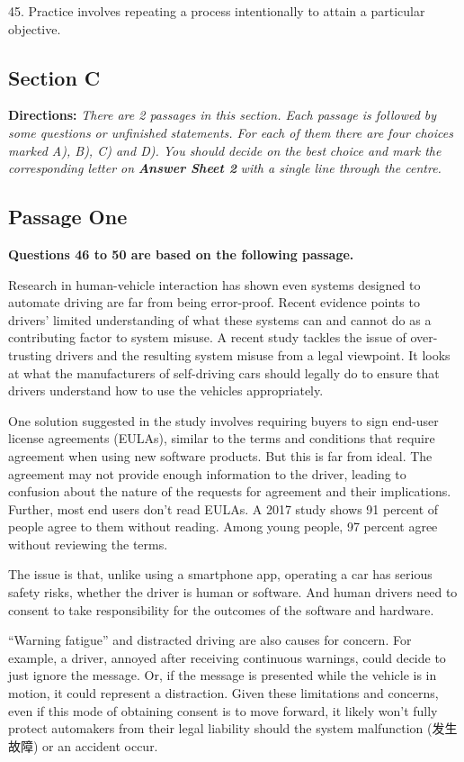 \documentclass[UTF8,11pt]{ctexart}
\begin{document}
45. Practice involves repeating a process intentionally to attain a particular objective.


\subsection*{\textbf{Section C}}


\textbf{Directions: }\textit{There are 2 passages in this section. Each passage is followed by some questions or unfinished} \textit{statements. For each of them there are four choices marked A), B), C) and D). You should decide on the best} \textit{choice and mark the corresponding letter on }\textbf{\textit{Answer Sheet 2}}\textit{ with a single line through the centre.}


\subsection*{\textbf{Passage One}}


\textbf{Questions 46 to 50 are based on the following passage.}


Research in human-vehicle interaction has shown even systems designed to automate driving are far from being error-proof. Recent evidence points to drivers’ limited understanding of what these systems can and cannot do as a contributing factor to system misuse. A recent study tackles the issue of over-trusting drivers and the resulting system misuse from a legal viewpoint. It looks at what the manufacturers of self-driving cars should legally do to ensure that drivers understand how to use the vehicles appropriately.


One solution suggested in the study involves requiring buyers to sign end-user license agreements (EULAs), similar to the terms and conditions that require agreement when using new software products. But this is far from ideal. The agreement may not provide enough information to the driver, leading to confusion about the nature of the requests for agreement and their implications. Further, most end users don’t read EULAs. A 2017 study shows 91 percent of people agree to them without reading. Among young people, 97 percent agree without reviewing the terms.


The issue is that, unlike using a smartphone app, operating a car has serious safety risks, whether the driver is human or software. And human drivers need to consent to take responsibility for the outcomes of the software and hardware.


“Warning fatigue” and distracted driving are also causes for concern. For example, a driver, annoyed after receiving continuous warnings, could decide to just ignore the message. Or, if the message is presented while the vehicle is in motion, it could represent a distraction. Given these limitations and concerns, even if this mode of obtaining consent is to move forward, it likely won’t fully protect automakers from their legal liability should the system malfunction (发生故障) or an accident occur.
\end{document}
